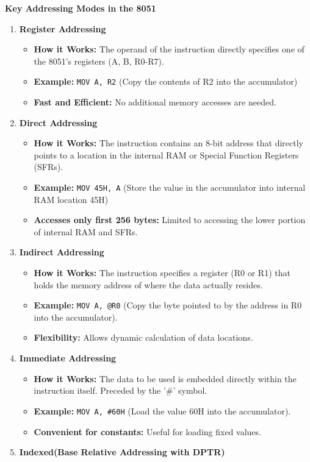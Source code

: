 \documentclass[
]{article}
\begin{document}
\textbf{Key Addressing Modes in the 8051}

\begin{enumerate}
\def\labelenumi{\arabic{enumi}.}
\item
  \textbf{Register Addressing}

  \begin{itemize}
  \item
    \textbf{How it Works:} The operand of the instruction directly
    specifies one of the 8051's registers (A, B, R0-R7).
  \item
    \textbf{Example:} \texttt{MOV\ A,\ R2} (Copy the contents of R2 into
    the accumulator)
  \item
    \textbf{Fast and Efficient:} No additional memory accesses are
    needed.
  \end{itemize}
\item
  \textbf{Direct Addressing}

  \begin{itemize}
  \item
    \textbf{How it Works:} The instruction contains an 8-bit address
    that directly points to a location in the internal RAM or Special
    Function Registers (SFRs).
  \item
    \textbf{Example:} \texttt{MOV\ 45H,\ A} (Store the value in the
    accumulator into internal RAM location 45H)
  \item
    \textbf{Accesses only first 256 bytes:} Limited to accessing the
    lower portion of internal RAM and SFRs.
  \end{itemize}
\item
  \textbf{Indirect Addressing}

  \begin{itemize}
  \item
    \textbf{How it Works:} The instruction specifies a register (R0 or
    R1) that holds the memory address of where the data actually
    resides.
  \item
    \textbf{Example:} \texttt{MOV\ A,\ @R0} (Copy the byte pointed to by
    the address in R0 into the accumulator).
  \item
    \textbf{Flexibility:} Allows dynamic calculation of data locations.
  \end{itemize}
\item
  \textbf{Immediate Addressing}

  \begin{itemize}
  \item
    \textbf{How it Works:} The data to be used is embedded directly
    within the instruction itself. Preceded by the '\#' symbol.
  \item
    \textbf{Example:} \texttt{MOV\ A,\ \#60H} (Load the value 60H into
    the accumulator).
  \item
    \textbf{Convenient for constants:} Useful for loading fixed values.
  \end{itemize}
\item
  \textbf{Indexed(Base Relative Addressing with DPTR)}


\end{enumerate}
\end{document}
